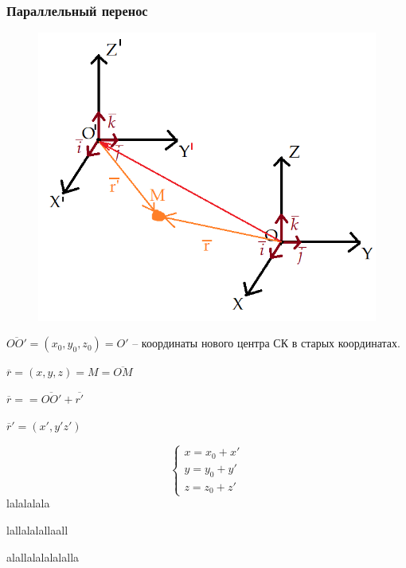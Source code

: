 \documentclass{article}
\begin{document}
\subsubsection{Параллельный перенос}
    \begin{figure}
        \centering
        \includegraphics[scale=0.3]{pic33.png}
    \end{figure}
    $\overline{OO'}=(x_0,y_0,z_0)=O'$ -- координаты нового центра СК в старых координатах.
    
    $\overline{r}=(x,y,z)=M=\overline{OM}$
    
    $\overline{r}==\overline{OO'}+\overline{r'}$
    
    $ \overline{r}'=(x',y'z') $
    
    $$ \begin{cases}x=x_0+x'\\y=y_0+y'\\z=z_0+z' \end{cases}$$
    lalalalala
    
    lallalalallaall
    
    alallalalalalalla
    
\newpage
\end{document}
